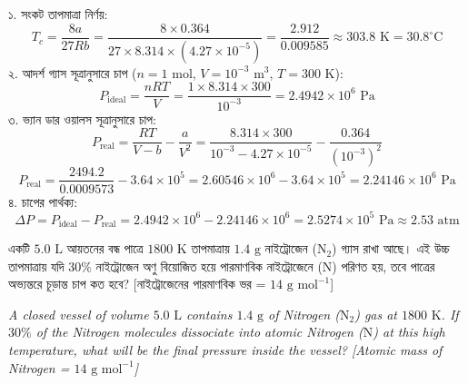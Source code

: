 \documentclass[12pt, a4paper]{article}
\begin{document}
{\vspace{1em}

\begin{tcolorbox}[solutionbox={সমাধান (Solution)}]
\noindent
১. সংকট তাপমাত্রা নির্ণয়:
\[ T_c = \frac{8 a}{27 R b} = \frac{8 \times 0.364}{27 \times 8.314 \times (4.27 \times 10^{-5})} = \frac{2.912}{0.009585} \approx 303.8\text{ K} = 30.8^\circ\text{C} \]
২. আদর্শ গ্যাস সূত্রানুসারে চাপ ($n = 1\text{ mol}$, $V = 10^{-3}\text{ m}^3$, $T = 300\text{ K}$):
\[ P_{\text{ideal}} = \frac{n R T}{V} = \frac{1 \times 8.314 \times 300}{10^{-3}} = 2.4942 \times 10^6\text{ Pa} \]
৩. ভ্যান ডার ওয়ালস সূত্রানুসারে চাপ:
\[ P_{\text{real}} = \frac{R T}{V - b} - \frac{a}{V^2} = \frac{8.314 \times 300}{10^{-3} - 4.27 \times 10^{-5}} - \frac{0.364}{(10^{-3})^2} \]
\[ P_{\text{real}} = \frac{2494.2}{0.0009573} - 3.64 \times 10^5 = 2.60546 \times 10^6 - 3.64 \times 10^5 = 2.24146 \times 10^6\text{ Pa} \]
৪. চাপের পার্থক্য:
\[ \Delta P = P_{\text{ideal}} - P_{\text{real}} = 2.4942 \times 10^6 - 2.24146 \times 10^6 = 2.5274 \times 10^5\text{ Pa} \approx 2.53\text{ atm} \]
\end{tcolorbox}
\begin{tcolorbox}[questionbox={প্রশ্ন (Question) 5}]
\noindent
একটি $5.0\text{ L}$ আয়তনের বন্ধ পাত্রে $1800\text{ K}$ তাপমাত্রায় $1.4\text{ g}$ নাইট্রোজেন ($\text{N}_2$) গ্যাস রাখা আছে। এই উচ্চ তাপমাত্রায় যদি $30\%$ নাইট্রোজেন অণু বিয়োজিত হয়ে পারমাণবিক নাইট্রোজেনে ($\text{N}$) পরিণত হয়, তবে পাত্রের অভ্যন্তরে চূড়ান্ত চাপ কত হবে? [নাইট্রোজেনের পারমাণবিক ভর = $14\text{ g mol}^{-1}$]

\vspace{0.8em}
\begin{english}
\noindent\textit{\color{darkgray}
A closed vessel of volume $5.0\text{ L}$ contains $1.4\text{ g}$ of Nitrogen ($\text{N}_2$) gas at $1800\text{ K}$. If $30\%$ of the Nitrogen molecules dissociate into atomic Nitrogen ($\text{N}$) at this high temperature, what will be the final pressure inside the vessel? [Atomic mass of Nitrogen = $14\text{ g mol}^{-1}$]
}
\end{english}
\end{tcolorbox}

\vspace{1em}

}
\end{document}
